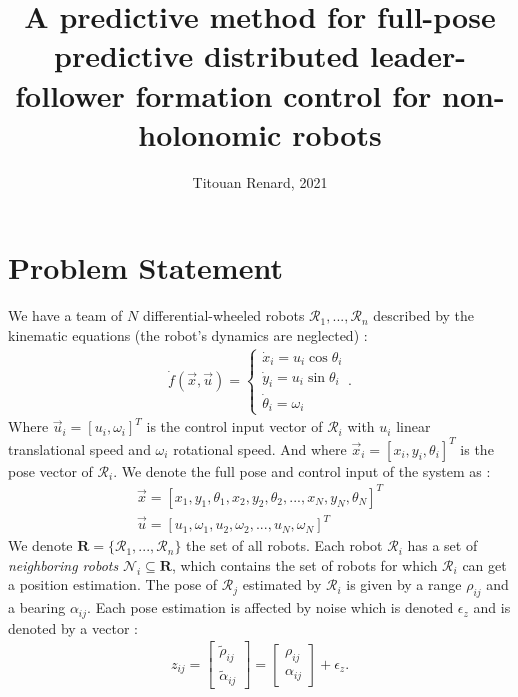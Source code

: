 \documentclass{article}
\title{A predictive method for full-pose predictive distributed leader-follower formation control for non-holonomic robots}
\author{Titouan Renard, 2021}
\begin{document}
\maketitle

\section{Problem Statement}

We have a team of $N$ differential-wheeled robots $\mathcal{R}_1, ..., \mathcal{R}_n$ described by the kinematic equations (the robot's dynamics are neglected) :
\begin{align}
    \dot{f}(\vec{x},\vec{u}) = 
    \begin{cases}
        \dot{x}_i = u_i \cos \theta_i \\
        \dot{y}_i = u_i \sin \theta_i \\
        \dot{\theta}_i = \omega_i
    \end{cases}.
\end{align}
Where $\vec{u}_i = [u_i,\omega_i]^T$ is the control input vector of $\mathcal{R}_i$ with $u_i$ linear translational speed and $\omega_i$ rotational speed. And where $\vec{x}_i = [x_i,y_i,\theta_i]^T$ is the pose vector of $\mathcal{R}_i$. We denote the full pose and control input of the system as :
\begin{align}
    \vec{x} = [x_1,y_1,\theta_1,x_2,y_2,\theta_2,...,x_N,y_N,\theta_N]^T \\
    \vec{u} = [u_1,\omega_1,u_2,\omega_2,...,u_N,\omega_N]^T
\end{align}
We denote $\textbf{R} = \{\mathcal{R}_1, ..., \mathcal{R}_n\}$ the set of all robots. Each robot $\mathcal{R}_i$ has a set of \textit{neighboring robots} $\mathcal{N}_i \subseteq \textbf{R}$, which contains the set of robots for which $\mathcal{R}_i$ can get a position estimation. The pose of $\mathcal{R}_j$ estimated by $\mathcal{R}_i$ is given by a range $\rho_{ij}$ and a bearing $\alpha_{ij}$. Each pose estimation is affected by noise which is denoted $\epsilon_z$ and is denoted by a vector  :
\begin{align}
    z_{ij} = \begin{bmatrix}
        \tilde{\rho}_{ij} \\
        \tilde{\alpha}_{ij} 
    \end{bmatrix}
    = \begin{bmatrix}
        {\rho}_{ij} \\
        {\alpha}_{ij} 
    \end{bmatrix} + \epsilon_z.
\end{align}
\end{document}
